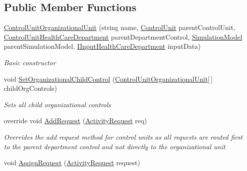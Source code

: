 \subsection*{Public Member Functions}
\begin{DoxyCompactItemize}
\item 
\hyperlink{class_general_health_care_elements_1_1_control_units_1_1_control_unit_organizational_unit_a097ac573d643dd72fc769e1321245ce7}{Control\+Unit\+Organizational\+Unit} (string name, \hyperlink{class_simulation_core_1_1_h_c_c_m_elements_1_1_control_unit}{Control\+Unit} parent\+Control\+Unit, \hyperlink{class_general_health_care_elements_1_1_control_units_1_1_control_unit_health_care_department}{Control\+Unit\+Health\+Care\+Department} parent\+Department\+Control, \hyperlink{class_simulation_core_1_1_simulation_classes_1_1_simulation_model}{Simulation\+Model} parent\+Simulation\+Model, \hyperlink{interface_general_health_care_elements_1_1_input_1_1_i_input_health_care_department}{I\+Input\+Health\+Care\+Department} input\+Data)
\begin{DoxyCompactList}\small\item\em Basic constructor \end{DoxyCompactList}\item 
void \hyperlink{class_general_health_care_elements_1_1_control_units_1_1_control_unit_organizational_unit_a1eb987f4a94835ff37c376ac5a3131c3}{Set\+Organizational\+Child\+Control} (\hyperlink{class_general_health_care_elements_1_1_control_units_1_1_control_unit_organizational_unit}{Control\+Unit\+Organizational\+Unit}\mbox{[}$\,$\mbox{]} child\+Org\+Controls)
\begin{DoxyCompactList}\small\item\em Sets all child organizational controls \end{DoxyCompactList}\item 
override void \hyperlink{class_general_health_care_elements_1_1_control_units_1_1_control_unit_organizational_unit_a8aa0201d4054b8a7ab7821284c9c9687}{Add\+Request} (\hyperlink{class_simulation_core_1_1_h_c_c_m_elements_1_1_activity_request}{Activity\+Request} req)
\begin{DoxyCompactList}\small\item\em Overrides the add request method for control units as all requests are routed first to the parent department control and not directly to the organizational unit \end{DoxyCompactList}\item 
void \hyperlink{class_general_health_care_elements_1_1_control_units_1_1_control_unit_organizational_unit_aebce01d98c096edb1941772c0aa31a30}{Assign\+Request} (\hyperlink{class_simulation_core_1_1_h_c_c_m_elements_1_1_activity_request}{Activity\+Request} request)

\end{DoxyCompactItemize}
